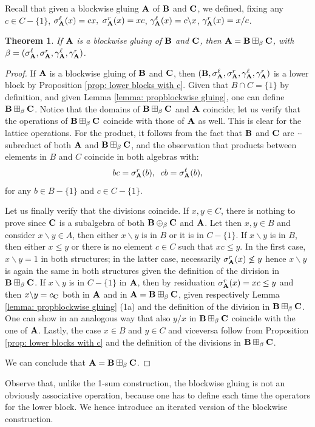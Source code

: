 \documentclass{amsart}
\newtheorem{theorem}{Theorem}[section]
\theoremstyle{definition}
\numberwithin{equation}{section}
\newcommand{\alg}[1]{{\textbf{\upshape #1}}}  %
\newcommand{\sell}{\sigma^\ell}
\newcommand{\sr}{\sigma^r}
\newcommand{\gell}{\gamma^\ell}
\newcommand{\gr}{\gamma^r}
\begin{document}
	Recall that given a blockwise gluing $\alg A$ of $\alg B$ and $\alg C$, we defined, fixing any $c \in C - \{1\}$, $\sell_{\alg A}(x) = cx,$ $\sr_{\alg A}(x) = xc$, $\gell_{\alg A}(x)= c \backslash x$, $\gr_{\alg A}(x) = x / c$.	
	\begin{theorem}\label{thm:blockwise}
		If $\alg A$ is a blockwise gluing of $\alg B$ and $\alg C$, then $\alg A = \alg B\boxplus_\beta \alg C$, with $\beta = (\sell_{\alg A}, \sr_{\alg A}, \gell_{\alg A}, \gr_{\alg A})$.
	\end{theorem}
	\begin{proof}
If $\alg A$ is a blockwise gluing of $\alg B$ and $\alg C$, then $(\alg B, \sell_{\alg A}, \sr_{\alg A}, \gell_{\alg A}, \gr_{\alg A})$ is a lower block by Proposition \ref{prop: lower blocks with c}. Given that $B \cap C = \{1\}$ by definition, and given Lemma \ref{lemma: propblockwise gluing}, one can define $\alg B \boxplus_\beta \alg C$. Notice that the domains of $\alg B \boxplus_\beta \alg C$ and $\alg A$ coincide; let us verify that the operations of $\alg B \boxplus_\beta \alg C$ coincide with those of $\alg A$ as well. 
This is clear for the lattice operations. For the product, it follows from the fact that $\alg B$ and $\alg C$ are $\cdot$-subreduct of both $\alg A$ and $\alg B \boxplus_\beta \alg C$, and the observation that products between elements in $B$ and $C$ coincide in both algebras with: $$bc = \sr_{\alg A}(b),\;\; cb = \sell_{\alg A}(b),$$ for any $b \in B - \{1\}$ and $c \in C-\{1\}$. 

Let us finally verify that the divisions coincide. If $x,y \in C$, there is nothing to prove since $\alg C$ is a subalgebra of both  $\alg B \oplus_\beta \alg C$ and $\alg A$. Let then $x, y \in B$ and consider $x \backslash y \in A$, then either $x \backslash y$ is in $B$ or it is in $C -\{1\}$. If $x \backslash y$ is in $B$, then either $x \leq y$ or there is no element $c \in C$ such that $xc \leq y$. In the first case, $x \backslash y = 1$ in both structures; in the latter case, necessarily $\sr_{\alg A}(x) \not\leq y$ hence  $x \backslash y$ is again the same in both structures given the definition of the division in $\alg B \boxplus_\beta \alg C$. If $x \backslash y$ is in $C -\{1\}$ in $\alg A$, then by residuation $\sr_{\alg A}(x) = xc \leq y$ and then $x \backslash y = c_{\alg C}$ both in $\alg A$ and in $\alg A=\alg B \boxplus_\beta \alg C$, given respectively Lemma \ref{lemma: propblockwise gluing} (1a) and the definition of the division in $\alg B \boxplus_\beta \alg C$.
One can show in an analogous way that also $y/x$ in $\alg B \boxplus_\beta \alg C$ coincide with the one of $\alg A$. 
Lastly, the case $x \in B$ and $y \in C$ and viceversa follow from Proposition \ref{prop: lower blocks with c}
 and the definition of the divisions in $\alg B \boxplus_\beta \alg C$.
		
		We can conclude that  $\alg A=\alg B \boxplus_\beta \alg C$.
\end{proof} 
Observe that, unlike the 1-sum construction, the blockwise gluing is not an obviously associative operation, because one has to define each time the operators for the lower block. We hence introduce an iterated version of the blockwise construction.
\end{document}
